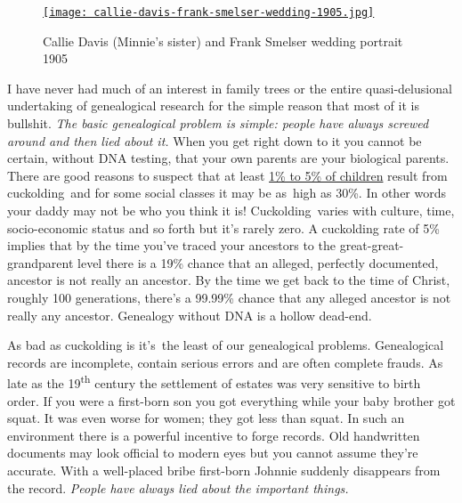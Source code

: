 
\captionsetup[figure]{labelformat=empty}
\begin{SCfigure}
\centering
\href{http://conceptcontrol.smugmug.com/People/Minnie-Raver/i-Z7tfbBJ/A}{\texttt{[image: callie-davis-frank-smelser-wedding-1905.jpg]}}
\caption{Callie Davis (Minnie's sister) and Frank Smelser wedding portrait 1905}
\label{fig:4230X1}
\end{SCfigure}

I have never had much of an interest in family trees or the entire
quasi-delusional undertaking of genealogical research for the simple
reason that most of it is bullshit. \emph{The basic genealogical problem
is simple: people have always screwed around and then lied about it.}
When you get right down to it you cannot be certain, without DNA
testing, that your own parents are your biological parents. There are
good reasons to suspect that at least
\href{http://www.washingtoncitypaper.com/articles/8308/to-have-and-to-cuckold}{1\%
to 5\% of children} result from cuckolding~and for some social classes
it may be as~high as 30\%. In other words your daddy may not be who you
think it is! Cuckolding~varies with culture, time, socio-economic status
and so forth but it's rarely zero. A cuckolding rate of 5\% implies that
by the time you've traced your ancestors to the great-great-grandparent
level there is a 19\% chance that an alleged, perfectly documented,
ancestor is not really an ancestor. By the time we get back to the time
of Christ, roughly 100 generations, there's a 99.99\% chance that any
alleged ancestor is not really any ancestor. Genealogy without DNA is a
hollow dead-end.

As bad as cuckolding is it's~the least of our genealogical problems.
Genealogical records are incomplete, contain serious errors and are
often complete frauds. As late as the 19\textsuperscript{th} century the
settlement of estates was very sensitive to birth order. If you were a
first-born son you got everything while your baby brother got squat. It
was even worse for women; they got less than squat. In such an
environment there is a powerful incentive to forge records. Old
handwritten documents may look official to modern eyes but you cannot
assume they're accurate. With a well-placed bribe first-born Johnnie
suddenly disappears from the record. \emph{People have always lied about
the important things.}

